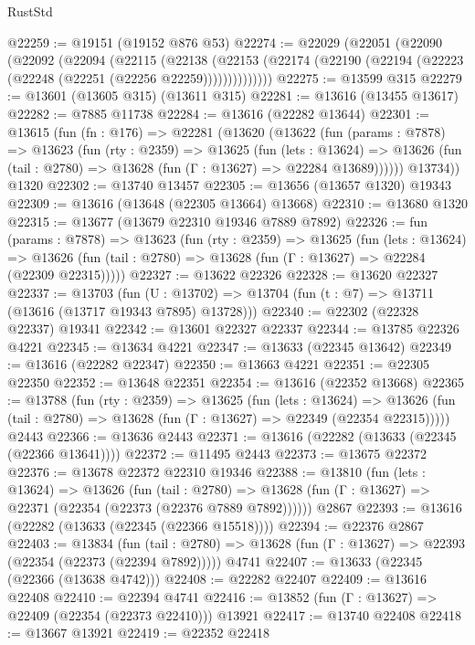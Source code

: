 \begin{lexlean}{RustStd}
\begin{coremodule}
@22259 := @19151 (@19152 @876 @53)
@22274 := @22029
    (@22051
      (@22090
        (@22092
          (@22094
            (@22115
              (@22138
                (@22153 (@22174 (@22190 (@22194 (@22223 (@22248 (@22251 (@22256 @22259))))))))))))))
@22275 := @13599 @315
@22279 := @13601 (@13605 @315) (@13611 @315)
@22281 := @13616 (@13455 @13617)
@22282 := @7885 @11738
@22284 := @13616 (@22282 @13644)
@22301 := @13615
    (fun (fn : @176) =>
    @22281
      (@13620
        (@13622
          (fun (params : @7878) =>
          @13623
            (fun (rty : @2359) =>
            @13625
              (fun (lets : @13624) =>
              @13626 (fun (tail : @2780) => @13628 (fun (Γ : @13627) => @22284 @13689))))))
        @13734))
    @1320
@22302 := @13740 @13457
@22305 := @13656 (@13657 @1320) @19343
@22309 := @13616 (@13648 (@22305 @13664) @13668)
@22310 := @13680 @1320
@22315 := @13677 (@13679 @22310 @19346 @7889 @7892)
@22326 := fun (params : @7878) =>
  @13623
    (fun (rty : @2359) =>
    @13625
      (fun (lets : @13624) =>
      @13626 (fun (tail : @2780) => @13628 (fun (Γ : @13627) => @22284 (@22309 @22315)))))
@22327 := @13622 @22326
@22328 := @13620 @22327
@22337 := @13703
    (fun (U : @13702) => @13704 (fun (t : @7) => @13711 (@13616 (@13717 @19343 @7895) @13728)))
@22340 := @22302 (@22328 @22337) @19341
@22342 := @13601 @22327 @22337
@22344 := @13785 @22326 @4221
@22345 := @13634 @4221
@22347 := @13633 (@22345 @13642)
@22349 := @13616 (@22282 @22347)
@22350 := @13663 @4221
@22351 := @22305 @22350
@22352 := @13648 @22351
@22354 := @13616 (@22352 @13668)
@22365 := @13788
    (fun (rty : @2359) =>
    @13625
      (fun (lets : @13624) =>
      @13626 (fun (tail : @2780) => @13628 (fun (Γ : @13627) => @22349 (@22354 @22315)))))
    @2443
@22366 := @13636 @2443
@22371 := @13616 (@22282 (@13633 (@22345 (@22366 @13641))))
@22372 := @11495 @2443
@22373 := @13675 @22372
@22376 := @13678 @22372 @22310 @19346
@22388 := @13810
    (fun (lets : @13624) =>
    @13626
      (fun (tail : @2780) =>
      @13628 (fun (Γ : @13627) => @22371 (@22354 (@22373 (@22376 @7889 @7892))))))
    @2867
@22393 := @13616 (@22282 (@13633 (@22345 (@22366 @15518))))
@22394 := @22376 @2867
@22403 := @13834
    (fun (tail : @2780) => @13628 (fun (Γ : @13627) => @22393 (@22354 (@22373 (@22394 @7892)))))
    @4741
@22407 := @13633 (@22345 (@22366 (@13638 @4742)))
@22408 := @22282 @22407
@22409 := @13616 @22408
@22410 := @22394 @4741
@22416 := @13852 (fun (Γ : @13627) => @22409 (@22354 (@22373 @22410))) @13921
@22417 := @13740 @22408
@22418 := @13667 @13921
@22419 := @22352 @22418

\end{coremodule}
\end{lexlean}
